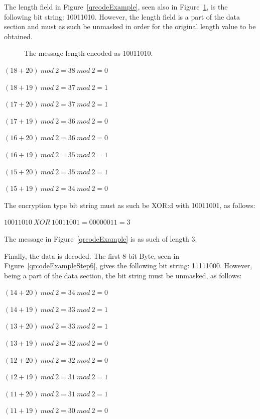 The length field in Figure~\ref{qrcodeExample}, seen also in Figure~\ref{qrcodeExampleStep5}, is the following bit string: 10011010. However, the length field is a part of the data section and must as such be unmasked in order for the original length value to be obtained.

	\begin{figure}[H]%
		\centering
		\caption{The message length encoded as 10011010.}
		\label{qrcodeExampleStep5}
	\end{figure}

\begin{center}

\((18+20)~mod~2=38~mod~2=0\)

\((18+19)~mod~2=37~mod~2=1\)

\((17+20)~mod~2=37~mod~2=1\)

\((17+19)~mod~2=36~mod~2=0\)

\((16+20)~mod~2=36~mod~2=0\) 

\((16+19)~mod~2=35~mod~2=1\)

\((15+20)~mod~2=35~mod~2=1\)

\((15+19)~mod~2=34~mod~2=0\)

\end{center}

The encryption type bit string must as such be XOR:d with 10011001, as follows:

\begin{center}
\(10011010~XOR~10011001=00000011=3\)
\end{center}

The message in Figure~\ref{qrcodeExample} is as such of length 3.

Finally, the data is decoded. The first 8-bit Byte, seen in Figure~\ref{qrcodeExampleStep6}, gives the following bit string: 11111000. However, being a part of the data section, the bit string must be unmasked, as follows:

\begin{center}

\((14+20)~mod~2=34~mod~2=0\)

\((14+19)~mod~2=33~mod~2=1\)

\((13+20)~mod~2=33~mod~2=1\)

\((13+19)~mod~2=32~mod~2=0\)

\((12+20)~mod~2=32~mod~2=0\) 

\((12+19)~mod~2=31~mod~2=1\)

\((11+20)~mod~2=31~mod~2=1\)

\((11+19)~mod~2=30~mod~2=0\)

\end{center}

